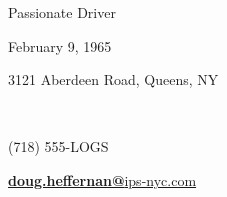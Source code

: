 \documentclass[]{friggeri-cv_reccius-experiment}
\begin{document}
      {Passionate Driver}
      
\vspace{0.3cm}   
\color{lightgray}\noindent\makebox[\textwidth]{\rule{\paperwidth-0.4cm}{2.5pt}}


\begin{info}
    \begin{flushleft}
    {{\small February 9, 1965}\hfill{\LARGE \textborn\thinspace\thinspace\verythinspace}\\
    
    \vspace{0.11cm}
    
    \small 3121 Aberdeen Road, Queens, NY}\hfill{\Large\faMapMarker\thinspace\thinspace\thinspace}\\
    
    \vspace{0.08cm}
    
    {\small (718) 555-LOGS}\hfill{\LARGE\Mobilefone\thinspace}\\

    \vspace{0.14cm}
    
    \href{mailto:doug.heffernan@international-parcel-service.com}{{\small\textbf{doug.heffernan@}ips-nyc.com}\hfill{\Large\Letter}\hspace{0.6mm}{\small \faMousePointer}}\\
    
    \end{flushleft}
\end{info}
\end{document}
